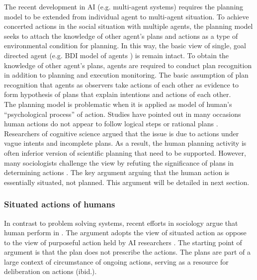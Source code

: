 The recent development in \ac{AI} (e.g. multi-agent systems) requires the planning model to be extended from individual agent to multi-agent situation. To achieve concerted actions in the social situation with multiple agents, the planning model seeks to attach the knowledge of other agent's plans and actions as a type of environmental condition for planning. In this way, the basic view of single, goal directed agent (e.g. BDI model of agents \cite{Georgeff1999}) is remain intact. To obtain the knowledge of other agent's plans, agents are required to conduct plan recognition in addition to planning and execution monitoring. The basic assumption of plan recognition that agents as observers take actions of each other as evidence to form hypothesis of plans that explain intentions and actions of each other.  \\

The planning model is problematic when it is applied as model of human's ``psychological process'' of action. Studies have pointed out in many occasions human actions do not appear to follow logical steps or rational plans \cite{Suchman1987}. Researchers of cognitive science argued that the issue is due to actions under vague intents and incomplete plans. As a result, the human planning activity is often inferior version of scientific planning that need to be supported. However, many sociologists challenge the view by refuting the significance of plans in determining actions  \cite{Suchman1987}. The key argument arguing that the human action is essentially situated, not planned. This argument will be detailed in next section.\\ 

\subsubsection{Situated actions of humans}
In contrast to problem solving systems, recent efforts in sociology argue that human perform in . The argument adopts the view of situated action as oppose to the view of purposeful action held by \ac{AI} researchers \cite{Suchman1987}. The starting point of argument is that the plan does not prescribe the actions. The plans are part of a large context of circumstance of ongoing actions, serving as a resource for deliberation on actions (ibid.).\\


